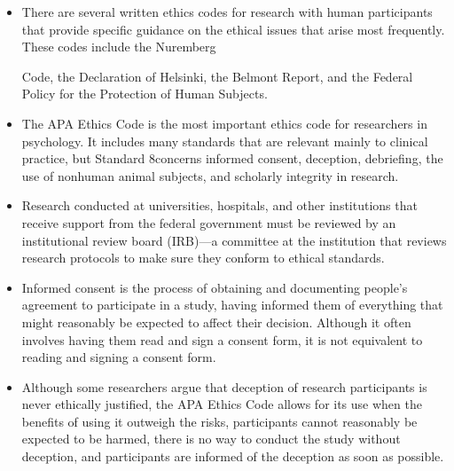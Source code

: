 \begin{fullwidth}

\begin{itemize}

\item There are several written ethics codes for research with human participants that provide specific guidance on the ethical issues that arise most frequently. These codes include the Nuremberg
  

Code, the Declaration of Helsinki, the Belmont Report, and the Federal Policy for the Protection
of Human Subjects.

\item The APA Ethics Code is the most important ethics code for researchers in psychology. It includes
many standards that are relevant mainly to clinical practice, but Standard 8concerns informed consent, deception, debriefing, the use of nonhuman animal subjects, and scholarly integrity in research.

\item Research conducted at universities, hospitals, and other institutions that receive support from the federal government must be reviewed by an institutional review board (IRB)---a committee at the institution that reviews research protocols to make sure they conform to ethical standards.

\item Informed consent is the process of obtaining and documenting people's agreement to participate in a study, having informed them of everything that might reasonably be expected to affect their decision. Although it often involves having them read and sign a consent form, it is not equivalent to reading and signing a consent form.

\item Although some researchers argue that deception of research participants is never ethically justified, the APA Ethics Code allows for its use when the benefits of using it outweigh the risks, participants cannot reasonably be expected to be harmed, there is no way to conduct the study without deception, and participants are informed of the deception as soon as possible.

\end{itemize}

\end{fullwidth}


\subsection{}

